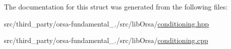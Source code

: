 The documentation for this struct was generated from the following files\+:\begin{DoxyCompactItemize}
\item 
src/third\+\_\+party/orsa-\/fundamental\+\_./src/lib\+Orsa/\hyperlink{conditioning_8hpp}{conditioning.\+hpp}\item 
src/third\+\_\+party/orsa-\/fundamental\+\_./src/lib\+Orsa/\hyperlink{conditioning_8cpp}{conditioning.\+cpp}\end{DoxyCompactItemize}
